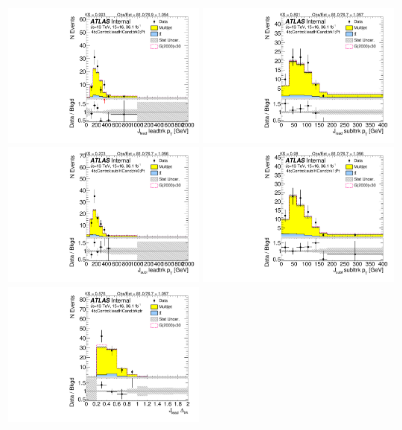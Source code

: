 \begin{figure}[htbp!]
\begin{center}
\includegraphics[width=0.45\textwidth,angle=-90]{figures/boosted/Control/b77_FourTag_Control_leadHCand_trk0_Pt.pdf}
\includegraphics[width=0.45\textwidth,angle=-90]{figures/boosted/Control/b77_FourTag_Control_leadHCand_trk1_Pt.pdf}\\
\includegraphics[width=0.45\textwidth,angle=-90]{figures/boosted/Control/b77_FourTag_Control_sublHCand_trk0_Pt.pdf}
\includegraphics[width=0.45\textwidth,angle=-90]{figures/boosted/Control/b77_FourTag_Control_sublHCand_trk1_Pt.pdf}\\
\includegraphics[width=0.45\textwidth,angle=-90]{figures/boosted/Control/b77_FourTag_Control_leadHCand_trk_dr.pdf}

\end{center}
\end{figure}
